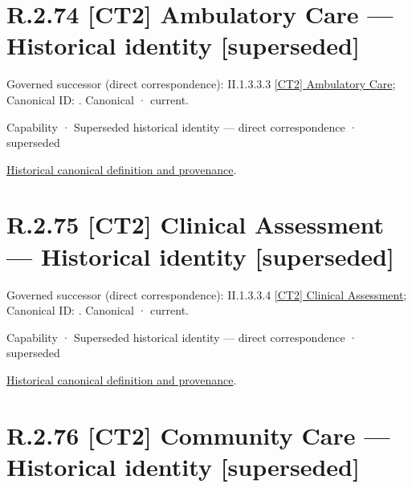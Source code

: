 \section*{R.2.74 [CT2] Ambulatory Care — Historical identity [superseded]}
\label{navigation:R.2.74}

{\small Governed successor (direct correspondence): II.1.3.3.3 \hyperref[element:f74d7c3a39c540c4b462576e8f09fc58]{[CT2] Ambulatory Care}; Canonical ID: \texttt{}. Canonical · current.}\par
\label{element:e996b61b6e7b4619913f427aed2b55b1}
{\small Capability · Superseded historical identity — direct correspondence · superseded}\par
\href{../../../../continuum/strategy/capability/e996b61b6e7b4619913f427aed2b55b1.md}{Historical canonical definition and provenance}.\par
\section*{R.2.75 [CT2] Clinical Assessment — Historical identity [superseded]}
\label{navigation:R.2.75}

{\small Governed successor (direct correspondence): II.1.3.3.4 \hyperref[element:a7d84c95e48c453797419813ca80a66c]{[CT2] Clinical Assessment}; Canonical ID: \texttt{}. Canonical · current.}\par
\label{element:1c3b553c87704e27ba211fbbd02d95cb}
{\small Capability · Superseded historical identity — direct correspondence · superseded}\par
\href{../../../../continuum/strategy/capability/1c3b553c87704e27ba211fbbd02d95cb.md}{Historical canonical definition and provenance}.\par
\section*{R.2.76 [CT2] Community Care — Historical identity [superseded]}
\label{navigation:R.2.76}

